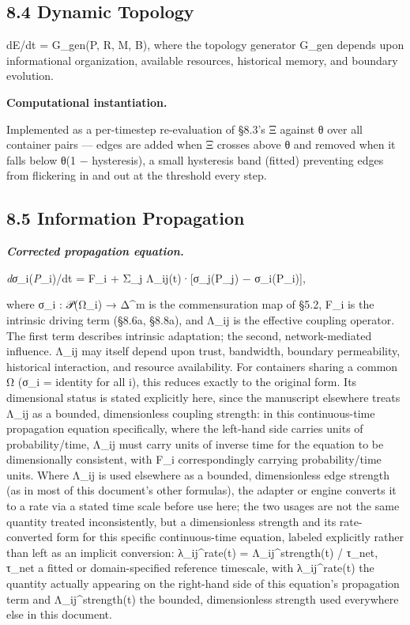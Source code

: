 \documentclass[
]{article}
\begin{document}
\hypertarget{dynamic-topology}{%
\subsection{8.4 Dynamic Topology}\label{dynamic-topology}}

dE/dt = G\_gen(P, R, M, B), where the topology generator G\_gen depends
upon informational organization, available resources, historical memory,
and boundary evolution.

\textbf{Computational instantiation.}

Implemented as a per-timestep re-evaluation of §8.3's Ξ against θ over
all container pairs --- edges are added when Ξ crosses above θ and
removed when it falls below θ(1 − hysteresis), a small hysteresis band
(fitted) preventing edges from flickering in and out at the threshold
every step.

\hypertarget{information-propagation}{%
\subsection{8.5 Information Propagation}\label{information-propagation}}

\emph{\textbf{Corrected propagation equation.}}

\emph{dσ}\_i(\emph{P}\_i)/dt = F\_i + Σ\_j Λ\_ij(t)·{[}σ\_j(P\_j) −
σ\_i(P\_i){]},

where σ\_i : 𝒫(Ω\_i) → Δ\^{}m is the commensuration map of §5.2, F\_i is
the intrinsic driving term (§8.6a, §8.8a), and Λ\_ij is the effective
coupling operator. The first term describes intrinsic adaptation; the
second, network-mediated influence. Λ\_ij may itself depend upon trust,
bandwidth, boundary permeability, historical interaction, and resource
availability. For containers sharing a common Ω (σ\_i = identity for all
i), this reduces exactly to the original form. Its dimensional status is
stated explicitly here, since the manuscript elsewhere treats Λ\_ij as a
bounded, dimensionless coupling strength: in this continuous-time
propagation equation specifically, where the left-hand side carries
units of probability/time, Λ\_ij must carry units of inverse time for
the equation to be dimensionally consistent, with F\_i correspondingly
carrying probability/time units. Where Λ\_ij is used elsewhere as a
bounded, dimensionless edge strength (as in most of this document's other
formulas), the adapter or engine converts it to a rate via a stated time
scale before use here; the two usages are not the same quantity treated
inconsistently, but a dimensionless strength and its rate-converted form
for this specific continuous-time equation, labeled explicitly rather
than left as an implicit conversion: λ\_ij\^{}rate(t) =
Λ\_ij\^{}strength(t) / τ\_net, τ\_net a fitted or domain-specified
reference timescale, with λ\_ij\^{}rate(t) the quantity actually
appearing on the right-hand side of this equation's propagation term and
Λ\_ij\^{}strength(t) the bounded, dimensionless strength used everywhere
else in this document.
\end{document}
